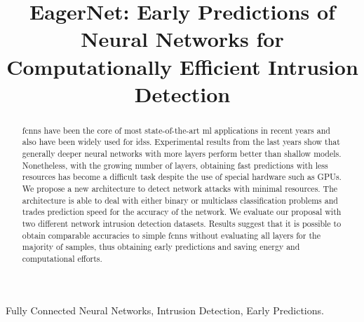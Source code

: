 \documentclass[conference]{IEEEtran}
\newcommand{\mynote}[3]{
    \fbox{\bfseries\sffamily\scriptsize#1}
    {\small$\blacktriangleright$\textsf{\emph{\color{#3}{#2}}}$\blacktriangleleft$}}
\newcommand{\todo}[1]{\mynote{TODO}{#1}{red}}
\begin{document}
\title{EagerNet: Early Predictions of Neural Networks for Computationally Efficient Intrusion Detection}

\author{
}



\maketitle

\begin{abstract}

\glspl{fcnn} have been the core of most state-of-the-art \gls{ml} applications in recent years and also have been widely used for \glspl{ids}. Experimental results from the last years show that generally deeper neural networks with more layers perform better than shallow models. Nonetheless, with the growing number of layers, obtaining fast predictions with less resources has become a difficult task despite the use of special hardware such as GPUs. We propose a new architecture to detect network attacks with minimal resources. The architecture is able to deal with either binary or multiclass classification problems and trades prediction speed for the accuracy of the network. We evaluate our proposal with two different network intrusion detection datasets. Results suggest that it is possible to obtain comparable accuracies to simple \glspl{fcnn} without evaluating all layers for the majority of samples, thus obtaining early predictions and saving energy and computational efforts.
\end{abstract}


\begin{IEEEkeywords}
Fully Connected Neural Networks, Intrusion Detection, Early Predictions.
\end{IEEEkeywords}
\end{document}
